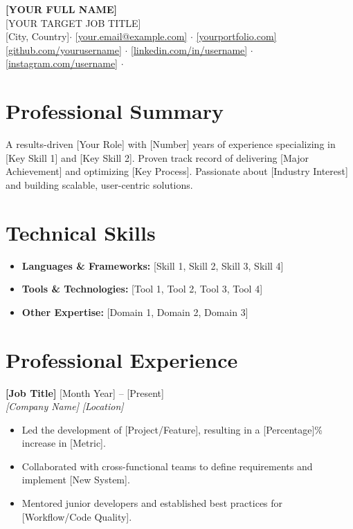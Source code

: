 \documentclass[11pt,a4paper]{article} %
\makeatletter
\newcommand{\resumeEntry}[4]{%
  {\textbf{\color{primary}#1}} \hfill #2\\
  {\textit{\color{accent}#3}} \hfill {\textit{\color{accent}#4}}
}
\newcommand{\cvname}{[YOUR FULL NAME]}
\newcommand{\cvrole}{[YOUR TARGET JOB TITLE]}
\newcommand{\cvlocation}{[City, Country]}
\newcommand{\cvemail}{[your.email@example.com]}
\newcommand{\cvwebsite}{[yourportfolio.com]}
\newcommand{\cvgithub}{[github.com/yourusername]}
\newcommand{\cvlinkedin}{[linkedin.com/in/username]}
\newcommand{\cvsocial}{[instagram.com/username]}
\newcommand{\cvphone}{[+00 000 0000 000]}
\makeatother
\begin{document}
\begin{center}
    {\LARGE \textbf{\color{primary}\cvname}}\\
    \vspace{2pt}
    {\large \color{accent}\cvrole}\\
    \vspace{4pt}
    \small
    \cvlocation \;$\cdot$\; 
    \href{mailto:\cvemail}{\cvemail} \;$\cdot$\; 
    \href{https://\cvwebsite}{\cvwebsite} \\
    \href{https://\cvgithub}{\cvgithub} \;$\cdot$\; 
    \href{https://\cvlinkedin}{\cvlinkedin} \;$\cdot$\; 
    \href{https://\cvsocial}{\cvsocial} \;$\cdot$\; 
    \cvphone
\end{center}

\section*{Professional Summary}
A results-driven [Your Role] with [Number] years of experience specializing in [Key Skill 1] and [Key Skill 2]. Proven track record of delivering [Major Achievement] and optimizing [Key Process]. Passionate about [Industry Interest] and building scalable, user-centric solutions.

\section*{Technical Skills}
\begin{itemize}
    \item \textbf{Languages \& Frameworks:} [Skill 1, Skill 2, Skill 3, Skill 4]
    \item \textbf{Tools \& Technologies:} [Tool 1, Tool 2, Tool 3, Tool 4]
    \item \textbf{Other Expertise:} [Domain 1, Domain 2, Domain 3]
\end{itemize}

\section*{Professional Experience}

\resumeEntry{[Job Title]}{[Month Year] -- [Present]}{[Company Name]}{[Location]}
\begin{itemize}
    \item Led the development of [Project/Feature], resulting in a [Percentage]\% increase in [Metric].
    \item Collaborated with cross-functional teams to define requirements and implement [New System].
    \item Mentored junior developers and established best practices for [Workflow/Code Quality].
\end{itemize}
\end{document}
